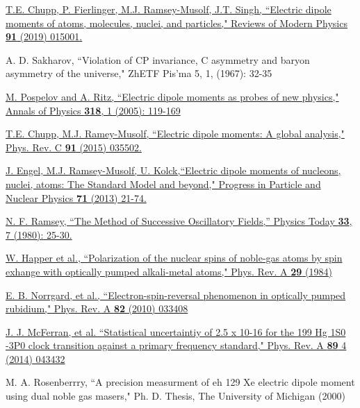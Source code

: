 \begin{thebibliography}{99}

\href{https://journals.aps.org/rmp/abstract/10.1103/RevModPhys.91.015001}{T.E. Chupp, P. Fierlinger, M.J. Ramsey-Musolf, J.T. Singh, ``Electric dipole moments of atoms, molecules, nuclei, and particles," Reviews of Modern Physics \textbf{91} (2019) 015001.}

 A. D. Sakharov, ``Violation of CP invariance, C asymmetry and baryon asymmetry of the universe," ZhETF Pis'ma 5, 1, (1967): 32-35

\href{https://www.sciencedirect.com/science/article/pii/S0003491605000539?via\%3Dihub}{M. Pospelov and A. Ritz, ``Electric dipole moments as probes of new physics," Annals of Physics \textbf{318}, 1 (2005): 119-169  }

 \href{https://journals.aps.org/prc/abstract/10.1103/PhysRevC.91.035502}{T.E. Chupp, M.J. Ramey-Musolf, ``Electric dipole moments: A global analysis," Phys. Rev. C \textbf{91} (2015) 035502.}

 \href{https://www.sciencedirect.com/science/article/pii/S0146641013000227?via\%3Dihub}{ J. Engel, M.J. Ramsey-Musolf, U. Kolck,``Electric dipole moments of nucleons, nuclei, atoms: The Standard Model and beyond,"  Progress in Particle and Nuclear Physics \textbf{71} (2013) 21-74.}

\href{https://physicstoday.scitation.org/doi/10.1063/1.2914161}{ N. F. Ramsey, ``The Method of Successive Oscillatory Fields,” Physics Today \textbf{33}, 7 (1980): 25-30.}

 \href{}{W. Happer et al., ``Polarization of the nuclear spins of noble-gas atoms by spin exhange with optically pumped alkali-metal atoms," Phys. Rev. A \textbf{29} (1984)}

\href{https://journals.aps.org/pra/abstract/10.1103/PhysRevA.82.033408}{E. B. Norrgard, et al., ``Electron-spin-reversal phenomenon in optically pumped rubidium,"  Phys. Rev. A \textbf{82} (2010) 033408 }

\href{}{J. J. McFerran, et al. ``Statistical uncertaintiy of 2.5 x 10-16 for the 199 Hg 1S0 -3P0 clock transition against a primary frequency standard,"  Phys. Rev. A \textbf{89} 4 (2014) 043432 }

 M. A. Rosenberrry, ``A precision measurment of eh 129 Xe electric dipole moment using dual noble gas masers," Ph. D. Thesis, The University of Michigan (2000)


\end{thebibliography}
